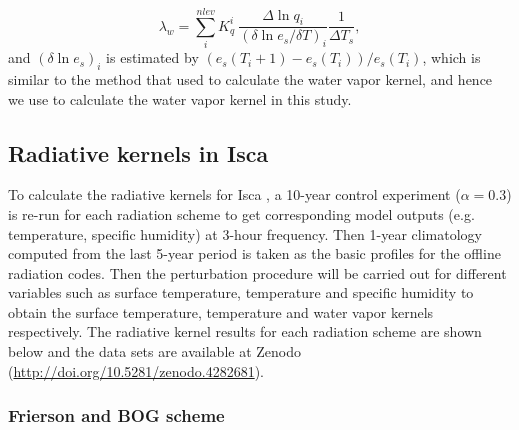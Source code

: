 \begin{equation}
\lambda_w = \sum_i^{nlev} K^i_q ~\frac{\Delta \ln q_i}{(\delta \ln e_s/ \delta T)_i} \frac{1}{\Delta T_s},
\label{eq:fb_wv_YHuang}
\end{equation}
and $(\delta \ln e_s)_i$ is estimated by $\left(e_s(T_i+1)-e_s(T_i)\right)/ e_s(T_i)$, which is similar to the method that \cite{Pendergrass2018} used to calculate the water vapor kernel, and hence we use  to calculate the water vapor kernel in this study.

\subsection{Radiative kernels in Isca}
 
To calculate the radiative kernels for Isca , a 10-year control experiment ($\alpha= 0.3$) is re-run for each radiation scheme to get corresponding model outputs (e.g. temperature, specific humidity) at 3-hour frequency. Then 1-year climatology computed from the last 5-year period is taken as the basic profiles for the offline radiation codes. Then the perturbation procedure will be carried out for different variables such as surface temperature, temperature and specific humidity to obtain the surface temperature, temperature and water vapor kernels respectively. The radiative kernel results for each radiation scheme are shown below and the data sets are available at Zenodo (\url{http://doi.org/10.5281/zenodo.4282681}).

\subsubsection{Frierson and BOG scheme}

